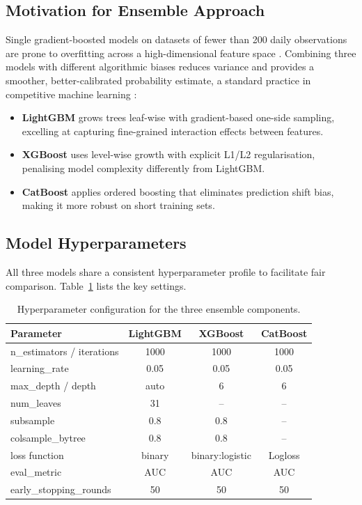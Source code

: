 \documentclass[12pt,a4paper]{report}
\begin{document}
\subsection{Motivation for Ensemble Approach}

Single gradient-boosted models on datasets of fewer than 200 daily
observations are prone to overfitting across a high-dimensional feature
space \cite{prokhorenkova2018}. Combining three
models with different algorithmic biases reduces variance and provides a
smoother, better-calibrated probability estimate, a standard practice in
competitive machine learning \cite{friedman2001}:

\begin{itemize}
  \item \textbf{LightGBM} \cite{ke2017} grows trees leaf-wise with
        gradient-based one-side sampling, excelling at capturing
        fine-grained interaction effects between features.
  \item \textbf{XGBoost} \cite{chen2016} uses level-wise growth with
        explicit L1/L2 regularisation, penalising model complexity
        differently from LightGBM.
  \item \textbf{CatBoost} \cite{prokhorenkova2018} applies ordered
        boosting that eliminates prediction shift bias, making it more
        robust on short training sets.
\end{itemize}

\subsection{Model Hyperparameters}

All three models share a consistent hyperparameter profile to facilitate
fair comparison. Table~\ref{tab:hyperparams} lists the key settings.

\begin{table}[H]
\centering
\caption{Hyperparameter configuration for the three ensemble components.}
\label{tab:hyperparams}
\begin{tabular}{lccc}
\toprule
\textbf{Parameter} & \textbf{LightGBM} & \textbf{XGBoost} &
\textbf{CatBoost} \\
\midrule
n\_estimators / iterations & 1000 & 1000 & 1000 \\
learning\_rate & 0.05 & 0.05 & 0.05 \\
max\_depth / depth & auto & 6 & 6 \\
num\_leaves & 31 & -- & -- \\
subsample & 0.8 & 0.8 & -- \\
colsample\_bytree & 0.8 & 0.8 & -- \\
loss function & binary & binary:logistic & Logloss \\
eval\_metric & AUC & AUC & AUC \\
early\_stopping\_rounds & 50 & 50 & 50 \\
\bottomrule
\end{tabular}
\end{table}
\end{document}

